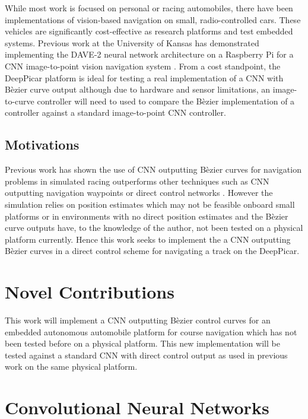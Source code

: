 \documentclass[conference]{IEEEtran}
\begin{document}
While most work is focused on personal or racing automobiles, there have been implementations of vision-based navigation on small, radio-controlled cars. These vehicles are significantly cost-effective as research platforms and test embedded systems. Previous work at the University of Kansas has demonstrated implementing the DAVE-2 neural network architecture on a Raspberry Pi for a CNN image-to-point vision navigation system \cite{bechtel2018}. From a cost standpoint, the DeepPicar platform is ideal for testing a real implementation of a CNN with B\`ezier curve output although due to hardware and sensor limitations, an image-to-curve controller will need to used to compare the B\`ezier implementation of a controller against a standard image-to-point CNN controller.

\subsection{Motivations}

Previous work has shown the use of CNN outputting B\`ezier curves for navigation problems in simulated racing outperforms other techniques such as CNN outputting navigation waypoints or direct control networks \cite{trent2020iros}. However the simulation relies on position estimates which may not be feasible onboard small platforms or in environments with no direct position estimates and the B\`ezier curve outputs have, to the knowledge of the author, not been tested on a physical platform currently. Hence this work seeks to implement the a CNN outputting B\`ezier curves in a direct control scheme for navigating a track on the DeepPicar.

\section{Novel Contributions}

This work will implement a CNN outputting B\`ezier control curves for an embedded autonomous automobile platform for course navigation which has not been tested before on a physical platform. This new implementation will be tested against a standard CNN with direct control output as used in previous work \cite{bechtel2018} on the same physical platform.

\section{Convolutional Neural Networks}
\end{document}
